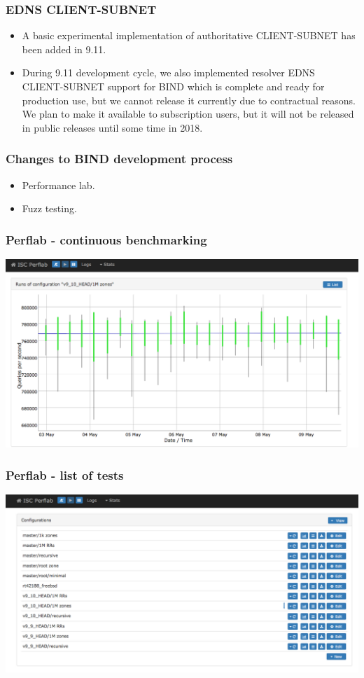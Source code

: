 \documentclass[aspectratio=169,14pt]{beamer}
\begin{document}
\frame
{
  \frametitle{EDNS CLIENT-SUBNET}

  \begin{itemize}

  \item A basic experimental implementation of authoritative
    CLIENT-SUBNET has been added in 9.11.

  \item During 9.11 development cycle, we also implemented resolver EDNS
    CLIENT-SUBNET support for BIND which is complete and ready for
    production use, but we cannot release it currently due to
    contractual reasons. We plan to make it available to subscription
    users, but it will not be released in public releases until some
    time in 2018.

  \end{itemize}
}

\frame
{
  \frametitle{Changes to BIND development process}

  \begin{itemize}

  \item Performance lab.

  \item Fuzz testing.

  \end{itemize}
}

\frame
{
  \frametitle{Perflab - continuous benchmarking}

  \begin{center}
    \includegraphics[scale=0.3]{perf1.png}
  \end{center}
}

\frame
{
  \frametitle{Perflab - list of tests}

  \begin{center}
    \includegraphics[scale=0.3]{perf2.png}
  \end{center}
}
\end{document}
